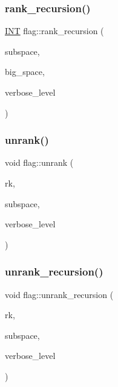 \mbox{\label{classflag_af799f2e8ddaaa51080651f9fc8d46fb3}} 
\subsubsection{\texorpdfstring{rank\+\_\+recursion()}{rank\_recursion()}}
{\footnotesize\ttfamily \mbox{\hyperlink{galois_8h_a09fddde158a3a20bd2dcadb609de11dc}{I\+NT}} flag\+::rank\+\_\+recursion (\begin{DoxyParamCaption}\item[{\mbox{\hyperlink{galois_8h_a09fddde158a3a20bd2dcadb609de11dc}{I\+NT}} $\ast$}]{subspace,  }\item[{\mbox{\hyperlink{galois_8h_a09fddde158a3a20bd2dcadb609de11dc}{I\+NT}} $\ast$}]{big\+\_\+space,  }\item[{\mbox{\hyperlink{galois_8h_a09fddde158a3a20bd2dcadb609de11dc}{I\+NT}}}]{verbose\+\_\+level }\end{DoxyParamCaption})}

\mbox{\label{classflag_a819d06b9c683d82acc50e7b7aad3c327}} 
\subsubsection{\texorpdfstring{unrank()}{unrank()}}
{\footnotesize\ttfamily void flag\+::unrank (\begin{DoxyParamCaption}\item[{\mbox{\hyperlink{galois_8h_a09fddde158a3a20bd2dcadb609de11dc}{I\+NT}}}]{rk,  }\item[{\mbox{\hyperlink{galois_8h_a09fddde158a3a20bd2dcadb609de11dc}{I\+NT}} $\ast$}]{subspace,  }\item[{\mbox{\hyperlink{galois_8h_a09fddde158a3a20bd2dcadb609de11dc}{I\+NT}}}]{verbose\+\_\+level }\end{DoxyParamCaption})}

\mbox{\label{classflag_aeb9e54aed9eca1fb951afe6c6c2200d8}} 
\subsubsection{\texorpdfstring{unrank\+\_\+recursion()}{unrank\_recursion()}}
{\footnotesize\ttfamily void flag\+::unrank\+\_\+recursion (\begin{DoxyParamCaption}\item[{\mbox{\hyperlink{galois_8h_a09fddde158a3a20bd2dcadb609de11dc}{I\+NT}}}]{rk,  }\item[{\mbox{\hyperlink{galois_8h_a09fddde158a3a20bd2dcadb609de11dc}{I\+NT}} $\ast$}]{subspace,  }\item[{\mbox{\hyperlink{galois_8h_a09fddde158a3a20bd2dcadb609de11dc}{I\+NT}}}]{verbose\+\_\+level }\end{DoxyParamCaption})}



